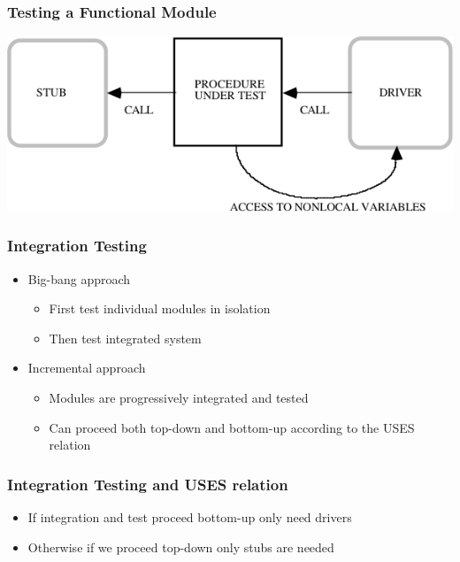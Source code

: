 \documentclass[t, 12pt, numbers, fleqn, handout]{beamer}
\begin{document}

\begin{frame}
\frametitle{Testing a Functional Module \cite{GhezziEtAl2003}}

\includegraphics[scale=0.5]{../Figures/TestingAFunctModule.png}

\end{frame}


\begin{frame}
\frametitle{Integration Testing}

\begin{itemize}
\item Big-bang approach
\begin{itemize}
\item First test individual modules in isolation
\item Then test integrated system
\end{itemize}
\item Incremental approach
\begin{itemize}
\item Modules are progressively integrated and tested
\item Can proceed both top-down and bottom-up according to the USES relation
\end{itemize}
\end{itemize}
\end{frame}


\begin{frame}
\frametitle{Integration Testing and USES relation}

\begin{itemize}
\item If integration and test proceed bottom-up only need drivers
\item Otherwise if we proceed top-down only stubs are needed
\end{itemize}
\end{frame}
\end{document}
